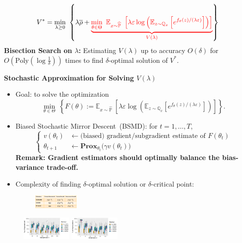 \documentclass[landscape,a0b,final,a4resizeable]{include/a0poster}
\newcommand{\bQ}{\mathbb{Q}}
\newcommand{\Reg}{\varepsilon}
\newcommand{\orho}{\overline{\rho}}
\newcommand{\hP}{\widehat{\mathbb{P}}}
\begin{document}
\begin{poster}
\begin{multicols}{4}
{
\LARGE
\vspace{-0.8in} 
\[
V^* = \min_{\lambda\ge0}~\left\{
\lambda\orho+ {\color{red}\underbrace{\min_{\theta\in\Theta}~\mathbb{E}_{x\sim \hP}~
\left[
\lambda\Reg\log\left(
\mathbb{E}_{z\sim \bQ_{x}}\left[ 
e^{f_{\theta}(z)/(\lambda\Reg)}
\right]\right)
\right]}_{V(\lambda)}}
\right\}
\]
{\bf Bisection Search on $\lambda$: }
Estimating $V(\lambda)$ up to accuracy $O(\delta)$ for $O(\text{Poly}(\log\frac{1}{\delta}))$ times to find $\delta$-optimal solution of $V^*$.
}
\newpage
{
\LARGE
{\bf Stochastic Approximation for Solving $V(\lambda)$}
\begin{itemize}
\item
Goal: to solve the optimization
\[
\min_{\theta\in\Theta}~\left\{F(\theta):=\mathbb{E}_{x\sim \hP}~
\left[
\lambda\Reg\log\left(
\mathbb{E}_{z\sim \bQ_{x}}\left[ 
e^{f_{\theta}(z)/(\lambda\Reg)}
\right]\right)
\right]\right\}.
\]
\item
Biased Stochastic Mirror Descent~(BSMD): for $t=1,\ldots,T$, 
\[
\left\{
\begin{aligned}
v(\theta_t)&\leftarrow \text{(biased) gradient/subgradient estimate of $F(\theta_t)$}\\
\theta_{t+1}&\leftarrow \textbf{Prox}_{\theta_t}\big(\gamma v(\theta_t)\big)
\end{aligned}
\right.
\]
{\bf Remark: Gradient estimators should {\color{blue}optimally} balance the {\color{blue}bias-variance} trade-off.}
\item
Complexity of finding $\delta$-optimal solution or $\delta$-critical point:
\begin{figure}[H]
\centering
\includegraphics[width=0.21\textwidth]{figures/Fig_com}
\end{figure}
\end{itemize}
}









\begin{figure}[H]
\centering
\includegraphics[width=0.22\textwidth]{figures/Risk_n}
\includegraphics[width=0.22\textwidth]{figures/Risk_dim}
\end{figure}



\end{multicols}
\end{poster}
\end{document}
